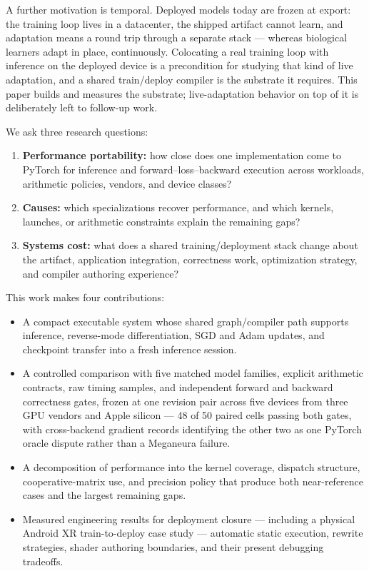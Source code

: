 \documentclass[10pt,twocolumn]{article}
\newcommand{\system}{Meganeura}
\begin{document}
A further motivation is temporal. Deployed models today are frozen at
export: the training loop lives in a datacenter, the shipped artifact cannot
learn, and adaptation means a round trip through a separate stack ---
whereas biological learners adapt in place, continuously. Colocating a real
training loop with inference on the deployed device is a precondition for
studying that kind of live adaptation, and a shared train/deploy compiler is
the substrate it requires. This paper builds and measures the substrate;
live-adaptation behavior on top of it is deliberately left to follow-up
work.

We ask three research questions:
\begin{enumerate}
  \item \textbf{Performance portability:} how close does one implementation
        come to PyTorch for inference and forward--loss--backward execution
        across workloads, arithmetic policies, vendors, and device classes?
  \item \textbf{Causes:} which specializations recover performance, and which
        kernels, launches, or arithmetic constraints explain the remaining
        gaps?
  \item \textbf{Systems cost:} what does a shared training/deployment stack
        change about the artifact, application integration, correctness work,
        optimization strategy, and compiler authoring experience?
\end{enumerate}

This work makes four contributions:
\begin{itemize}
  \item A compact executable system whose shared graph/compiler path supports
        inference, reverse-mode differentiation, SGD and Adam updates, and
        checkpoint transfer into a fresh inference session.
  \item A controlled comparison with five matched model families, explicit
        arithmetic contracts, raw timing samples, and independent forward and
        backward correctness gates, frozen at one revision pair across five
        devices from three GPU vendors and Apple silicon --- 48 of 50 paired
        cells passing both gates, with cross-backend gradient records
        identifying the other two as one PyTorch oracle dispute rather than a
        \system{} failure.
  \item A decomposition of performance into the kernel coverage, dispatch
        structure, cooperative-matrix use, and precision policy that produce
        both near-reference cases and the largest remaining gaps.
  \item Measured engineering results for deployment closure --- including a
        physical Android XR train-to-deploy case study --- automatic static
        execution, rewrite strategies, shader authoring boundaries, and their
        present debugging tradeoffs.
\end{itemize}
\end{document}
